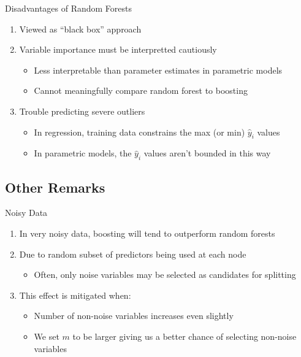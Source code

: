 \documentclass[pdf]{beamer}
\begin{document}
		\begin{frame}{Disadvantages of Random Forests}
			\begin{enumerate}
				\item Viewed as ``black box'' approach
				\item Variable importance must be interpretted cautiously
					\begin{itemize}
						\item Less interpretable than parameter estimates in parametric models
						\item Cannot meaningfully compare random forest to boosting 
					\end{itemize}  
				\item Trouble predicting severe outliers
					\begin{itemize}
						\item In regression, training data constrains the max (or min) $\hat{y}_i$ values 
						\item In parametric models, the $\hat{y}_i$ values aren't bounded in this way
					\end{itemize}
				
			\end{enumerate}
		\end{frame}
	
	\subsection{Other Remarks}
		
		\begin{frame}{Noisy Data}
			\begin{enumerate}
				\item In very noisy data, boosting will tend to outperform random forests
				\item Due to random subset of predictors being used at each node
					\begin{itemize}
						\item Often, only noise variables may be selected as candidates for splitting
					\end{itemize}
				\item This effect is mitigated when:
					\begin{itemize}
						\item Number of non-noise variables increases even slightly
						\item We set $m$ to be larger giving us a better chance of selecting non-noise variables 
					\end{itemize}
			\end{enumerate}
		\end{frame}
		
\end{document}
